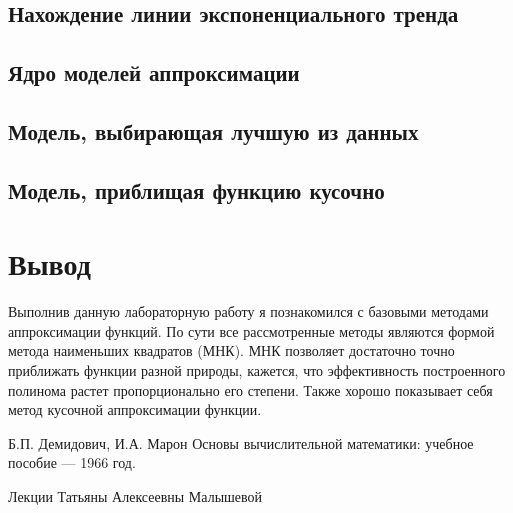 \documentclass{article}
\begin{document}


\subsection{Нахождение линии экспоненциального тренда}



\subsection{Ядро моделей аппроксимации}



\subsection{Модель, выбирающая лучшую из данных}



\subsection{Модель, приблищая функцию кусочно}



\section{Вывод}

Выполнив данную лабораторную работу я познакомился
с базовыми методами аппроксимации функций. По сути 
все рассмотренные методы являются формой метода
наименьших квадратов (МНК). МНК позволяет 
достаточно точно приближать функции разной природы,
кажется, что эффективность построенного полинома растет
пропорционально его степени. Также хорошо показывает
себя метод кусочной аппроксимации функции.

\begin{thebibliography}{9}

    Б.П. Демидович, И.А. Марон Основы вычислительной математики:
    учебное пособие — 1966 год.

    Лекции Татьяны Алексеевны Малышевой

\end{thebibliography}
\end{document}
